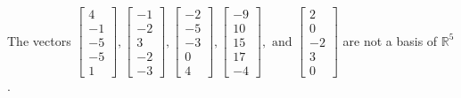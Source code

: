 \begin{exercise}
\begin{exerciseStatement}
  \end{exerciseStatement}
  \begin{exerciseAnswer}
   The vectors \(\left[\begin{array}{r}
4 \\
-1 \\
-5 \\
-5 \\
1
\end{array}\right] , \left[\begin{array}{r}
-1 \\
-2 \\
3 \\
-2 \\
-3
\end{array}\right] , \left[\begin{array}{r}
-2 \\
-5 \\
-3 \\
0 \\
4
\end{array}\right] , \left[\begin{array}{r}
-9 \\
10 \\
15 \\
17 \\
-4
\end{array}\right] , \text{ and } \left[\begin{array}{r}
2 \\
0 \\
-2 \\
3 \\
0
\end{array}\right]\) 
  	 are not  a basis of \(\mathbb{R}^5\).
  


  \end{exerciseAnswer}
\end{exercise}